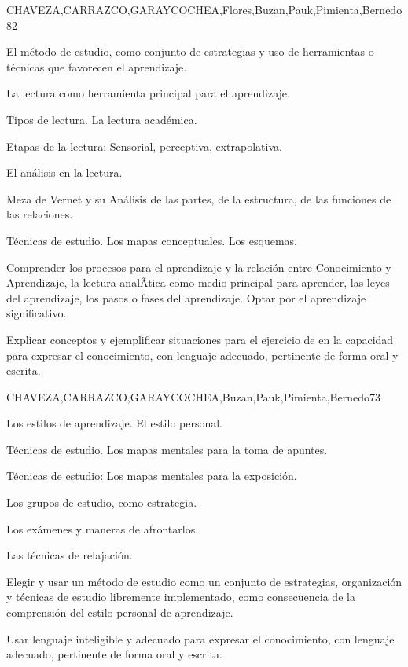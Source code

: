 \begin{syllabus}
\begin{unit}{}{CHAVEZA,CARRAZCO,GARAYCOCHEA,Flores,Buzan,Pauk,Pimienta,Bernedo}{8}{2}
\begin{topics}
        \item El método de estudio, como conjunto de estrategias y uso de herramientas o técnicas que favorecen el aprendizaje.
        \item La lectura como herramienta principal para el aprendizaje.
        \item Tipos de lectura. La lectura académica.
        \item Etapas de la lectura: Sensorial, perceptiva, extrapolativa.
        \item El análisis en la lectura.
        \item Meza de Vernet y su Análisis de las partes, de la estructura, de las funciones de las relaciones.
        \item Técnicas de estudio. Los mapas conceptuales. Los esquemas.
\end{topics}
\begin{unitgoals}
        \item Comprender los procesos para el aprendizaje y la relación entre Conocimiento y Aprendizaje, la  lectura analÃ­tica como medio principal para aprender, las leyes del aprendizaje, los pasos o fases del aprendizaje. Optar por el aprendizaje  significativo.
        \item Explicar conceptos y ejemplificar situaciones  para el ejercicio de en la capacidad para expresar el conocimiento, con lenguaje adecuado, pertinente de forma oral y escrita.
\end{unitgoals}
\end{unit}

\begin{unit}{}{CHAVEZA,CARRAZCO,GARAYCOCHEA,Buzan,Pauk,Pimienta,Bernedo}{7}{3}
\begin{topics}
        \item Los estilos de aprendizaje. El estilo personal.
        \item Técnicas de estudio. Los mapas mentales para la toma de apuntes.
        \item Técnicas de estudio: Los mapas mentales para la exposición.
        \item Los grupos de estudio, como estrategia.
        \item Los exámenes y maneras de afrontarlos.
        \item Las técnicas de relajación.
\end{topics}
\begin{unitgoals}
        \item Elegir y usar un método de estudio como un conjunto de estrategias, organización  y técnicas de estudio libremente implementado, como consecuencia  de la comprensión del estilo personal de aprendizaje.
        \item Usar lenguaje inteligible y adecuado para expresar el conocimiento, con lenguaje adecuado, pertinente de forma oral y escrita.
\end{unitgoals}
\end{unit}




\end{syllabus}
